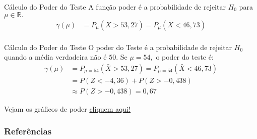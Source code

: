 \documentclass[12pt]{beamer}
\begin{document}
\begin{frame}{}
	\begin{block}{Cálculo do Poder do Teste}
		\justifying
A função poder é a probabilidade de rejeitar \( H_0 \) para $\mu\in \mathbb{R}.$
		\begin{align*}
			\gamma(\mu)&=P_{\mu}(\bar{X}>53,27)=P_{\mu}(\bar{X}<46,73)\\
		\end{align*}
	\end{block}
	\pause
	\begin{block}{Cálculo do Poder do Teste}
		\justifying
		O poder do Teste é a probabilidade de rejeitar $H_{0}$ quando a média verdadeira não é $50.$ Se $\mu=54,$ o poder do teste é:
		\begin{align*}
			\gamma(\mu)&=P_{\mu = 54}(\bar{X}>53,27)=P_{\mu = 54}(\bar{X}<46,73)\\
			&=P(Z < -4,36) + P(Z > -0,438)\\
			&\approx P(Z > -0,438) = 0,67
		\end{align*}
	\end{block}
	\nocite{hogg}
\end{frame}

\begin{frame}{}
	\begin{block}{}
		Vejam os gráficos de poder \href{https://est711.shinyapps.io/FuncaoPoder/}{cliquem aqui!}
	\end{block}
\end{frame}

\begin{frame}[allowframebreaks]
\frametitle{\bf Referências}
\printbibliography
\end{frame}
\end{document}

